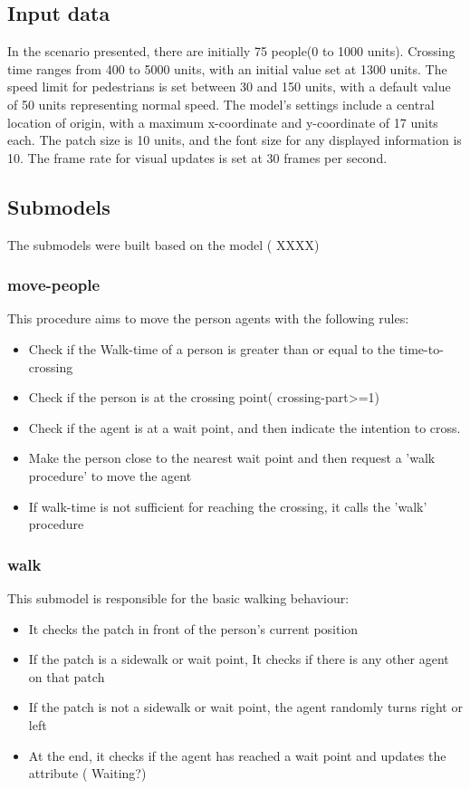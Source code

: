 \documentclass[10pt]{report}
\numberwithin{figure}{section}
\numberwithin{table}{section}
\begin{document}
\subsection{Input data}

In the scenario presented, there are initially 75 people(0 to 1000 units). Crossing time ranges from 400 to 5000 units, with an initial value set at 1300 units. The speed limit for pedestrians is set between 30 and 150 units, with a default value of 50 units representing normal speed. The model's settings include a central location of origin, with a maximum x-coordinate and y-coordinate of 17 units each. The patch size is 10 units, and the font size for any displayed information is 10. The frame rate for visual updates is set at 30 frames per second.


\subsection{Submodels}

The submodels were built based on the model ( XXXX) 

\subsubsection{move-people}
This procedure aims to move the person agents with the following rules:

\begin{itemize}
    \item Check if the Walk-time of a person is greater than or equal to the time-to-crossing
    \item Check if the person is at the crossing point( crossing-part>=1)
    \item Check if the agent is at a wait point, and then indicate the intention to cross.
    \item  Make the person close to the nearest wait point and then request a 'walk procedure' to move the agent
    \item  If walk-time is not sufficient for reaching the crossing, it calls the 'walk' procedure
\end{itemize}

\subsubsection{walk}
This submodel is responsible for the basic walking behaviour:

\begin{itemize}
    \item It checks the patch in front of the person's current position
    \item If the patch is a sidewalk or wait point, It checks if there is any other agent on that patch
    \item If the patch is not a sidewalk or wait point, the agent randomly turns right or left 
    \item At the end, it checks if the agent has reached a wait point and updates the attribute ( Waiting?)
\end{itemize}
\end{document}
